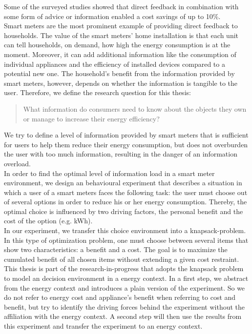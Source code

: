Some of the surveyed studies showed that direct feedback in combination with some form of advice or information enabled a cost savings of up to 10\%.\\
Smart meters are the most prominent example of providing direct feedback to households. The value of the smart meters' home installation is that each unit can tell households, on demand, how high the energy consumption is at the moment. Moreover, it can add additional information like the consumption of individual appliances and the efficiency of installed devices compared to a potential new one. The household's benefit from the information provided by smart meters, however, depends on whether the information is tangible to the user.
Therefore, we define the research question for this thesis:
\begin{quotation}
What information do consumers need to know about the objects they own or manage to increase their energy efficiency? 
\end{quotation}
We try to define a level of information provided by smart meters that is sufficient for users to help them reduce their energy consumption, but does not overburden the user with too much information, resulting in the danger of an information overload.\\
In order to find the optimal level of information load in a smart meter environment, we design an behavioural experiment that describes a situation in which a user of a smart meters faces the following task: the user must choose out of several options in order to reduce his or her energy consumption. Thereby, the optimal choice is influenced by two driving factors, the personal benefit and the cost of the option (e.g. kWh).\\
In our experiment, we transfer this choice environment into a knapsack-problem. In this type of optimization problem, one must choose between several items that show two characteristics: a benefit and a cost. The goal is to maximize the cumulated benefit of all chosen items without extending a given cost restraint.\\ 
This thesis is part of the research-in-progress that adopts the knapsack problem to model an decision environment in a energy context. In a first step, we abstract from the energy context and introduces a plain version of the experiment. So we do not refer to energy cost and appliance's benefit when referring to cost and benefit, but try to identify the driving forces behind the experiment without the affiliation with the energy context. A second step will then use the results from this experiment and transfer the experiment to an energy context.\\ 
